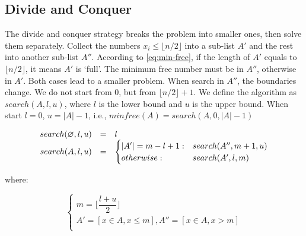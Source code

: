 \documentclass[b5paper]{article}
\begin{document}





\subsection*{Divide and Conquer}
The divide and conquer strategy breaks the problem into smaller ones, then solve them separately. Collect the numbers $x_i \leq \lfloor n/2 \rfloor$ into a sub-list $A'$ and the rest into another sub-list $A''$. According to \cref{eq:min-free}, if the length of $A'$ equals to $\lfloor n/2 \rfloor$, it means $A'$ is `full'. The minimum free number must be in $A''$, otherwise in $A'$. Both cases lead to a smaller problem. When search in $A''$, the boundaries change. We do not start from $0$, but from $\lfloor n/2 \rfloor + 1$. We define the algorithm as $search(A, l, u)$, where $l$ is the lower bound and $u$ is the upper bound. When start $l = 0$, $u = |A| - 1$, i.e., $minfree(A) = search(A, 0, |A|-1)$

\[
\begin{array}{rcl}
search(\varnothing, l, u) & = & l \\
search(A, l, u) & = & \begin{cases}
       |A'| = m - l + 1 : & search(A'', m+1, u) \\
       otherwise : & search(A',  l, m) \\
\end{cases}
\end{array}
\]

where:

\[
\begin{cases}
m = \lfloor \dfrac{l + u}{2} \rfloor \\
A' = [x \in A, x \leq m ], A'' = [x \in A, x > m ] \\
\end{cases}
\]
\end{document}

